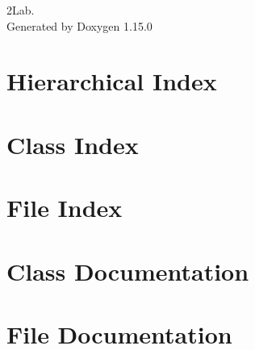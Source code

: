 \documentclass[twoside]{book}
\newcommand{\+}{\discretionary{\mbox{\scriptsize$\hookleftarrow$}}{}{}}
\newcommand{\clearemptydoublepage}{%
    \newpage{\pagestyle{empty}\cleardoublepage}%
  }
\begin{document}
  \raggedbottom
    \hypersetup{pageanchor=false,
                bookmarksnumbered=true,
                pdfencoding=unicode
               }
  \begin{titlepage}
  \vspace*{7cm}
  \begin{center}%
  {\Large 2\+Lab.}\\
  \vspace*{1cm}
  {\large Generated by Doxygen 1.15.0}\\
  \end{center}
  \end{titlepage}
  \clearemptydoublepage
  \tableofcontents
  \clearemptydoublepage
  \hypersetup{pageanchor=true}
\chapter{Hierarchical Index}

\chapter{Class Index}

\chapter{File Index}

\chapter{Class Documentation}





\chapter{File Documentation}












  \backmatter
  \newpage
  \clearemptydoublepage
  \printindex
\end{document}
